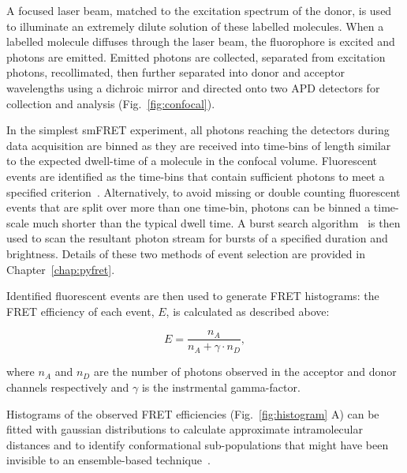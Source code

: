 A focused laser beam, matched to the excitation spectrum of the donor, is used to illuminate an extremely dilute solution of these labelled molecules. When a labelled molecule diffuses through the laser beam, the fluorophore is excited and photons are emitted.  Emitted photons are collected, separated from excitation photons, recollimated, then further separated into donor and acceptor wavelengths using a dichroic mirror and directed onto two APD detectors for collection and analysis (Fig.~\ref{fig:confocal}).

In the simplest smFRET experiment, all photons reaching the detectors during data acquisition are binned as they are received into time-bins of length similar to the expected dwell-time of a molecule in the confocal volume. Fluorescent events are identified as the time-bins that contain sufficient photons to meet a specified criterion~\cite{weiss00}. Alternatively, to avoid missing or double counting fluorescent events that are split over more than one time-bin, photons can be binned a time-scale much shorter than the typical dwell time. A burst search algorithm~\cite{nir06} is then used to scan the resultant photon stream for bursts of a specified duration and brightness. Details of these two methods of event selection are provided in Chapter~\ref{chap:pyfret}.

Identified fluorescent events are then used to generate FRET histograms: the FRET efficiency of each event, $E$, is calculated as described above:

\begin{equation}
E = \frac{n_A}{n_A + \gamma \cdot n_D},
\label{eq:Eprod}
\end{equation} 

where $n_A$ and $n_D$ are the number of photons observed in the acceptor and donor channels respectively and $\gamma$ is the instrmental gamma-factor.

Histograms of the observed FRET efficiencies (Fig.~\ref{fig:histogram} A) can be fitted with gaussian distributions to calculate approximate intramolecular distances and to identify conformational sub-populations that might have been invisible to an ensemble-based technique~\cite{joo08, Walter2008}.

